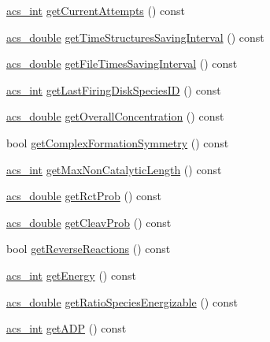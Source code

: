 \begin{DoxyCompactItemize}
\hyperlink{acs__headers_8h_a8d277355641a098190360234e2ebde35}{acs\-\_\-int} \hyperlink{classenvironment_a0851e3481e6fec7f4feef126d5a6704c}{get\-Current\-Attempts} () const 
\item 
\hyperlink{acs__headers_8h_ab776853a005fcbf56af0424a2a4dd607}{acs\-\_\-double} \hyperlink{classenvironment_a892dd7bd29342c4206c39556d91a83da}{get\-Time\-Structures\-Saving\-Interval} () const 
\item 
\hyperlink{acs__headers_8h_ab776853a005fcbf56af0424a2a4dd607}{acs\-\_\-double} \hyperlink{classenvironment_a77e995bee54ab4e09f165a857a7b0272}{get\-File\-Times\-Saving\-Interval} () const 
\item 
\hyperlink{acs__headers_8h_a8d277355641a098190360234e2ebde35}{acs\-\_\-int} \hyperlink{classenvironment_a984f79e5f89b774b65db901899687ac0}{get\-Last\-Firing\-Disk\-Species\-I\-D} () const 
\item 
\hyperlink{acs__headers_8h_ab776853a005fcbf56af0424a2a4dd607}{acs\-\_\-double} \hyperlink{classenvironment_a8bea373c48982a78ee46c5c5fafcb81c}{get\-Overall\-Concentration} () const 
\item 
bool \hyperlink{classenvironment_a609a22828e5f92d74d31793b907621ad}{get\-Complex\-Formation\-Symmetry} () const 
\item 
\hyperlink{acs__headers_8h_a8d277355641a098190360234e2ebde35}{acs\-\_\-int} \hyperlink{classenvironment_aca760caf9354f541020c1db58490b18f}{get\-Max\-Non\-Catalytic\-Length} () const 
\item 
\hyperlink{acs__headers_8h_ab776853a005fcbf56af0424a2a4dd607}{acs\-\_\-double} \hyperlink{classenvironment_ae244aa972cf10c103b8b20d95703831f}{get\-Rct\-Prob} () const 
\item 
\hyperlink{acs__headers_8h_ab776853a005fcbf56af0424a2a4dd607}{acs\-\_\-double} \hyperlink{classenvironment_ac728f6ab012c42fa85a2e2f70df7dc58}{get\-Cleav\-Prob} () const 
\item 
bool \hyperlink{classenvironment_a2a2ac2a8140df67688a71d3349adf04a}{get\-Reverse\-Reactions} () const 
\item 
\hyperlink{acs__headers_8h_a8d277355641a098190360234e2ebde35}{acs\-\_\-int} \hyperlink{classenvironment_ab463a460de102c79c1044ab8a2c176ae}{get\-Energy} () const 
\item 
\hyperlink{acs__headers_8h_ab776853a005fcbf56af0424a2a4dd607}{acs\-\_\-double} \hyperlink{classenvironment_a4fcc6030b68a37bedff870b9c48c188d}{get\-Ratio\-Species\-Energizable} () const 
\item 
\hyperlink{acs__headers_8h_a8d277355641a098190360234e2ebde35}{acs\-\_\-int} \hyperlink{classenvironment_a69d18914fe7c8e96b10992668960b83b}{get\-A\-D\-P} () const 

\end{DoxyCompactItemize}
